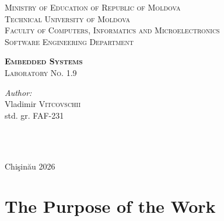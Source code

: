 \documentclass[12pt]{article}
\begin{document}
\begin{titlepage}
   \begin{center}
    \textsc{\large Ministry of Education of Republic of Moldova}\\[0.5cm]
    \textsc{\large Technical University of Moldova}\\[0.5cm]
    \textsc{\large Faculty of Computers, Informatics and Microelectronics}\\[0.5cm]
    \textsc{\large Software Engineering Department}\\[1.2cm]

    \vspace{25mm}

    {\LARGE \textbf{\textsc{Embedded Systems}}}\\[0.5cm]
    \textsc{\large Laboratory No. 1.9}\\[0.5cm]

    \newcommand{\HRule}{\rule{\linewidth}{0.5mm}}
    \vspace{80mm}

    \begin{minipage}[t]{0.4\textwidth}
    \begin{flushleft} \large
    \emph{Author:} \\
    Vladimir \textsc{Vitcovschii}\\
    std. gr. FAF-231
    \end{flushleft}
    \end{minipage}
    ~
    \begin{minipage}[t]{0.4\textwidth}
    \begin{flushright} \large
    \end{flushright}
    \end{minipage}\\[3cm]

    \vspace{5mm}
    \large Chi\c{s}in\u{a}u 2026\\[0.5cm]

    \vfill
    \end{center}
\end{titlepage}

\clearpage
\tableofcontents
\clearpage

\setcounter{page}{2}
\pagestyle{fancy}
\fancyhf{}
\rhead{\thepage}

\section{The Purpose of the Work}
\end{document}
